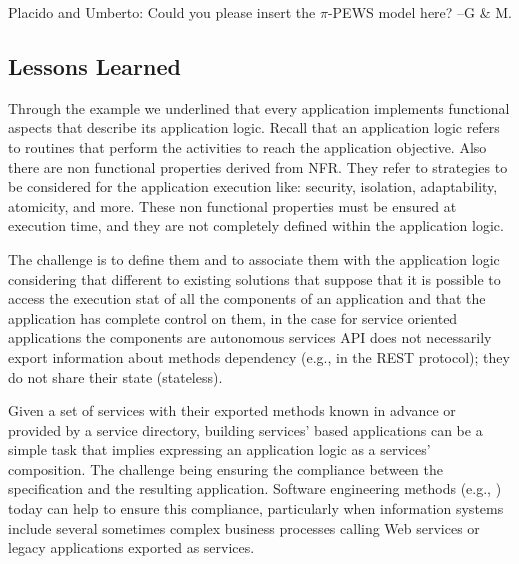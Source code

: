 {\color{magenta} Placido and Umberto: Could you please insert the $\pi$-PEWS model here? --G \& M.}


\subsection{Lessons Learned}

Through the example we underlined that every application implements functional aspects that describe its application logic. 
Recall that an application logic refers to routines that perform the activities to reach the application objective.
Also there are non functional properties derived from NFR. They refer to strategies to be considered for the application execution like: security, isolation, adaptability, atomicity, and more.
These non functional properties must be ensured at execution time, and they are not completely defined within the application logic.

The challenge is to define them and to associate them with the application logic considering that different to existing solutions that suppose that it is possible to access the execution stat of all the components  of an application and that the application has complete control on them, in the case for service oriented applications  the components are autonomous services
API does not necessarily export information about methods dependency (e.g., in the REST protocol);
they do not share their state (stateless).

Given a set of services with their exported methods known in advance or provided by a  service directory, building services' based applications can be  a simple task that implies expressing an application logic as a services' composition. The challenge being  ensuring the compliance between the specification and the resulting application. Software engineering methods (e.g., \cite{1,2,decastro1,PapazoglouH06}) today can help to ensure this compliance, particularly when information systems include several sometimes complex business processes calling Web services or legacy applications exported as services. 
